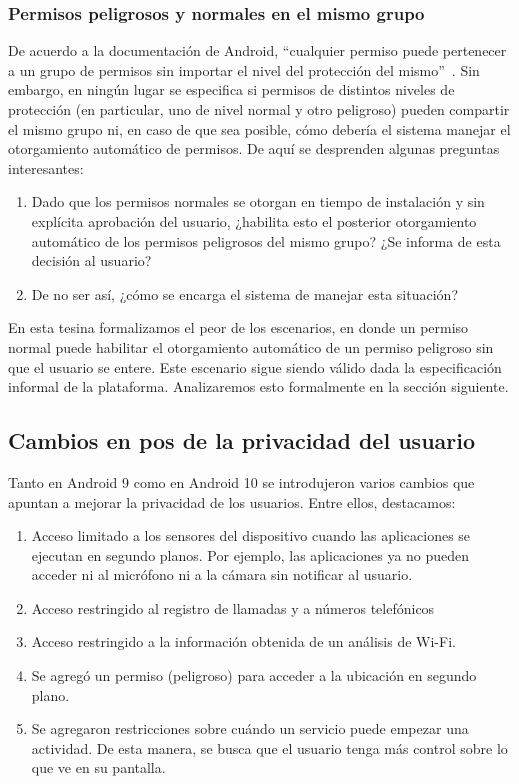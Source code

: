 \subsubsection{Permisos peligrosos y normales en el mismo grupo}
De acuerdo a la documentación de Android, ``cualquier permiso puede pertenecer a un grupo de
permisos sin importar el nivel del protección del mismo''~\cite{android-permissions}. Sin embargo, en
ningún lugar se especifica si permisos de distintos niveles de protección (en particular, uno de
nivel normal y otro peligroso) pueden compartir el mismo grupo ni, en caso de que sea posible, cómo
debería el sistema manejar el otorgamiento automático de permisos. De aquí se desprenden algunas
preguntas interesantes:
\begin{enumerate}
    \item Dado que los permisos normales se otorgan en tiempo de instalación y sin explícita
          aprobación del usuario, ¿habilita esto el posterior otorgamiento automático de los
          permisos peligrosos del mismo grupo? ¿Se informa de esta decisión al usuario?
    \item De no ser así, ¿cómo se encarga el sistema de manejar esta situación?
\end{enumerate}
En esta tesina formalizamos el peor de los escenarios, en donde un permiso normal puede habilitar el
otorgamiento automático de un permiso peligroso sin que el usuario se entere. Este escenario sigue
siendo válido dada la especificación informal de la plataforma. Analizaremos esto formalmente en la
sección siguiente.


\subsection{Cambios en pos de la privacidad del usuario}
Tanto en Android 9 como en Android 10 se introdujeron varios cambios que apuntan a mejorar la
privacidad de los usuarios. Entre ellos, destacamos:
\begin{enumerate}
    \item Acceso limitado a los sensores del dispositivo cuando las aplicaciones se ejecutan en
          segundo planos. Por ejemplo, las aplicaciones ya no pueden acceder ni al micrófono ni a la
          cámara sin notificar al usuario.
    \item Acceso restringido al registro de llamadas y a números telefónicos
    \item Acceso restringido a la información obtenida de un análisis de Wi-Fi.
    \item Se agregó un permiso (peligroso) para acceder a la ubicación en segundo plano.
    \item Se agregaron restricciones sobre cuándo un servicio puede empezar una actividad. De esta
          manera, se busca que el usuario tenga más control sobre lo que ve en su pantalla.
\end{enumerate}

